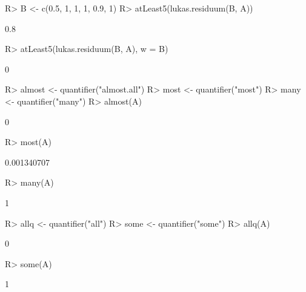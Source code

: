 \documentclass{article}\usepackage[]{graphicx}\usepackage[]{color}
\begin{document}
\begin{Schunk}
% --begin: "quant3"
\begin{Sinput}
R> B <- c(0.5, 1, 1, 1, 0.9, 1)
R> atLeast5(lukas.residuum(B, A))
\end{Sinput}
\begin{Soutput}
[1] 0.8
\end{Soutput}
%
% --end: "quant3"
\end{Schunk}

\begin{Schunk}
% --begin: "quant4"
\begin{Sinput}
R> atLeast5(lukas.residuum(B, A), w = B)
\end{Sinput}
\begin{Soutput}
[1] 0
\end{Soutput}
%
% --end: "quant4"
\end{Schunk}

\begin{Schunk}
% --begin: "quant5"
\begin{Sinput}
R> almost <- quantifier("almost.all")
R> most <- quantifier("most")
R> many <- quantifier("many")
R> almost(A)
\end{Sinput}
\begin{Soutput}
[1] 0
\end{Soutput}
\begin{Sinput}
R> most(A)
\end{Sinput}
\begin{Soutput}
[1] 0.001340707
\end{Soutput}
\begin{Sinput}
R> many(A)
\end{Sinput}
\begin{Soutput}
[1] 1
\end{Soutput}
%
% --end: "quant5"
\end{Schunk}

\begin{Schunk}
% --begin: "quant6"
\begin{Sinput}
R> allq <- quantifier("all")
R> some <- quantifier("some")
R> allq(A)
\end{Sinput}
\begin{Soutput}
[1] 0
\end{Soutput}
\begin{Sinput}
R> some(A)
\end{Sinput}
\begin{Soutput}
[1] 1
\end{Soutput}
%
% --end: "quant6"
\end{Schunk}
\end{document}
